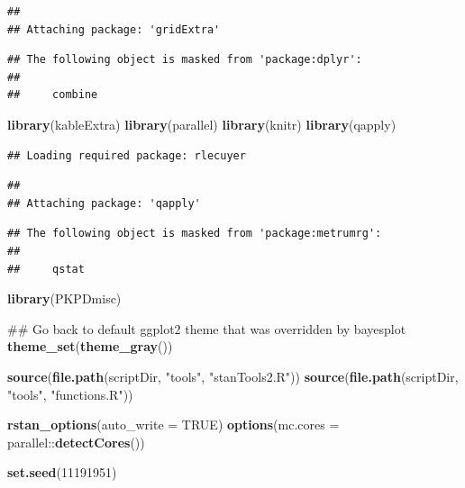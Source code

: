 \documentclass[]{article}
\newenvironment{Shaded}{\begin{snugshade}}{\end{snugshade}}
\newcommand{\KeywordTok}[1]{\textcolor[rgb]{0.13,0.29,0.53}{\textbf{{#1}}}}
\newcommand{\DataTypeTok}[1]{\textcolor[rgb]{0.13,0.29,0.53}{{#1}}}
\newcommand{\DecValTok}[1]{\textcolor[rgb]{0.00,0.00,0.81}{{#1}}}
\newcommand{\StringTok}[1]{\textcolor[rgb]{0.31,0.60,0.02}{{#1}}}
\newcommand{\OtherTok}[1]{\textcolor[rgb]{0.56,0.35,0.01}{{#1}}}
\newcommand{\NormalTok}[1]{{#1}}
\begin{document}
\begin{verbatim}
## 
## Attaching package: 'gridExtra'
\end{verbatim}

\begin{verbatim}
## The following object is masked from 'package:dplyr':
## 
##     combine
\end{verbatim}

\begin{Shaded}
\begin{Highlighting}[]
\KeywordTok{library}\NormalTok{(kableExtra)}
\KeywordTok{library}\NormalTok{(parallel)}
\KeywordTok{library}\NormalTok{(knitr)}
\KeywordTok{library}\NormalTok{(qapply)}
\end{Highlighting}
\end{Shaded}

\begin{verbatim}
## Loading required package: rlecuyer
\end{verbatim}

\begin{verbatim}
## 
## Attaching package: 'qapply'
\end{verbatim}

\begin{verbatim}
## The following object is masked from 'package:metrumrg':
## 
##     qstat
\end{verbatim}

\begin{Shaded}
\begin{Highlighting}[]
\KeywordTok{library}\NormalTok{(PKPDmisc)}

\NormalTok{## Go back to default ggplot2 theme that was overridden by bayesplot}
\KeywordTok{theme_set}\NormalTok{(}\KeywordTok{theme_gray}\NormalTok{())}

\KeywordTok{source}\NormalTok{(}\KeywordTok{file.path}\NormalTok{(scriptDir, }\StringTok{"tools"}\NormalTok{, }\StringTok{"stanTools2.R"}\NormalTok{))}
\KeywordTok{source}\NormalTok{(}\KeywordTok{file.path}\NormalTok{(scriptDir, }\StringTok{"tools"}\NormalTok{, }\StringTok{"functions.R"}\NormalTok{))}

\KeywordTok{rstan_options}\NormalTok{(}\DataTypeTok{auto_write =} \OtherTok{TRUE}\NormalTok{)}
\KeywordTok{options}\NormalTok{(}\DataTypeTok{mc.cores =} \NormalTok{parallel::}\KeywordTok{detectCores}\NormalTok{())}

\KeywordTok{set.seed}\NormalTok{(}\DecValTok{11191951}\NormalTok{) }
\end{Highlighting}
\end{Shaded}
\end{document}
